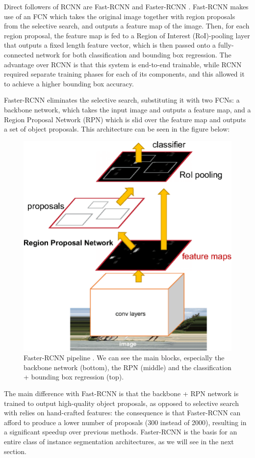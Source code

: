 \documentclass[12pt,twoside]{report}
\begin{document}
Direct followers of RCNN are Fast-RCNN \cite{fastrcnn} and Faster-RCNN \cite{fasterrcnn}. Fast-RCNN makes use of an FCN which takes the original image together with region proposals from the selective search, and outputs a feature map of the image. Then, for each region proposal, the feature map is fed to a Region of Interest (RoI)-pooling layer that outputs a fixed length feature vector, which is then passed onto a fully-connected network for both classification and bounding box regression. The advantage over RCNN is that this system is end-to-end trainable, while RCNN required separate training phases for each of its components, and this allowed it to achieve a higher bounding box accuracy.

Faster-RCNN eliminates the selective search, substituting it with two FCNs: a backbone network, which takes the input image and outputs a feature map, and a Region Proposal Network (RPN) which is slid over the feature map and outputs a set of object proposals. This architecture can be seen in the figure below:

\begin{figure}[ht]%
\centering
\includegraphics[width = 0.35\hsize]{./figures/faster-rcnn}
\caption{Faster-RCNN pipeline \cite{fasterrcnn}. We can see the main blocks, especially the backbone network (bottom), the RPN (middle) and the classification + bounding box regression (top).}
\label{fig:faster-rcnn}
\end{figure}

The main difference with Fast-RCNN is that the backbone + RPN network is trained to output high-quality object proposals, as opposed to selective search with relies on hand-crafted features: the consequence is that Faster-RCNN can afford to produce a lower number of proposals (300 instead of 2000), resulting in a significant speedup over previous methods. Faster-RCNN is the basis for an entire class of instance segmentation architectures, as we will see in the next section.
\\
\\
\end{document}
